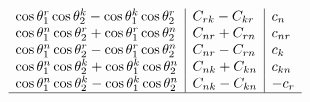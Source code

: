 \begin{table}[htb]
\begin{center}
\begin{adjustbox}{scale=0.85,center}
\begin{math}
\begin{array}{l|l|l}
\cos \theta_1^r \cos \theta_2^k-\cos \theta_1^k \cos \theta_2^r & C_{r k}-C_{k r} & c_n \\
\cos \theta_1^n \cos \theta_2^r+\cos \theta_1^r \cos \theta_2^n & C_{n r}+C_{r n} & c_{n r} \\
\cos \theta_1^n \cos \theta_2^r-\cos \theta_1^r \cos \theta_2^n & C_{n r}-C_{r n} & c_k \\
\cos \theta_1^n \cos \theta_2^k+\cos \theta_1^k \cos \theta_2^n & C_{n k}+C_{k n} & c_{k n} \\
\cos \theta_1^n \cos \theta_2^k-\cos \theta_1^k \cos \theta_2^n & C_{n k}-C_{k n} & -c_r \\
\hline 

\end{array}
\end{math}
\end{adjustbox}
\end{center}
\end{table}
